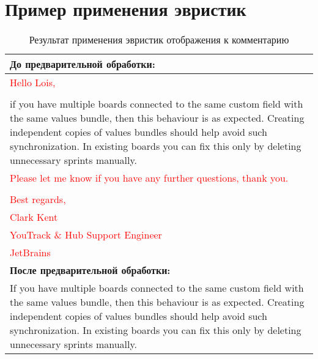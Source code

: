 \chapter{Пример применения эвристик}
\label{appx02}

\begin{table}[tph!]
\caption{Результат применения эвристик отображения к комментарию}
\label{vop_prepr}
\centering
\begin{tabular}{|L{11cm}|}
\hline
\textbf{До предварительной обработки:}\\
\hline
\textcolor{red}{Hello Lois,}\\
 \\
if you have multiple boards connected to the same custom field with the same values bundle, then this behaviour is as expected. Creating independent copies of values bundles  should help avoid such synchronization. In existing boards you can fix this only by deleting unnecessary sprints manually.\\
\textcolor{red}{Please let me know if you have any further questions, thank you.}\\
 \\
\textcolor{red}{Best regards,}\\
\textcolor{red}{Clark Kent}\\
\textcolor{red}{YouTrack \& Hub Support Engineer}\\
\textcolor{red}{JetBrains}\\
\hline
\textbf{После предварительной обработки:}\\
\hline
If you have multiple boards connected to the same custom field with the same values bundle, then this behaviour is as expected. Creating independent copies of values bundles should help avoid such synchronization. In existing boards you can fix this only by deleting unnecessary sprints manually.\\
\hline
\end{tabular}
\end{table}